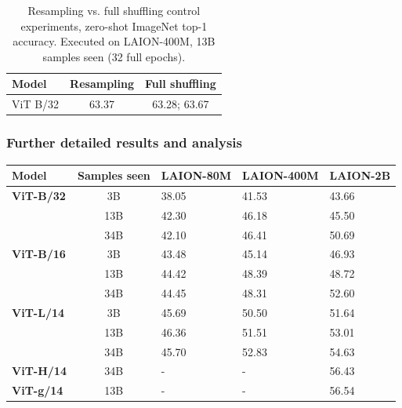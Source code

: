 \begin{appendix}
\begin{table}[!htb]
\setlength\tabcolsep{3.0pt}
    \centering
    \small
    \begin{tabular}{lcc}\toprule
    Model & Resampling &  Full shuffling \\ \midrule
    ViT B/32 & 63.37 & 63.28; 63.67 \\\bottomrule
    \end{tabular}
    \caption{
    Resampling vs. full shuffling control experiments, zero-shot ImageNet top-1 accuracy. Executed on LAION-400M, 13B samples seen (32 full epochs).
    \vspace{-1em}
    }
    \label{tab:resampling_shuffling}
\end{table}


\subsubsection{Further detailed results and analysis}
\label{sec:appendix:further_results}

\begin{table}[!tbh]
\centering
\small
{}
\begin{tabular}{@{}lclll@{}}
\toprule
\textbf{Model}                     & \textbf{Samples seen} & \textbf{LAION-80M} & \textbf{LAION-400M} & \textbf{LAION-2B} \\ \midrule
\textbf{ViT-B/32} & 3B           & 38.05     & 41.53      & 43.66       \\
                          & 13B          & 42.30     & 46.18       & 45.50       \\
                          & 34B          & 42.10         & 46.41      &50.69        \\ \midrule
\textbf{ViT-B/16} & 3B           & 43.48     & 45.14      & 46.93       \\
                          & 13B          & 44.42     & 48.39       & 48.72       \\
                          & 34B          & 44.45         & 48.31      & 52.60        \\ \midrule                          
\textbf{ViT-L/14} & 3B           & 45.69     & 50.50      & 51.64       \\         
& 13B          & 46.36         & 51.51      & 53.01           \\
                          & 34B          & 45.70         & 52.83       & 54.63       \\ \midrule 
\textbf{ViT-H/14} & 34B           & -     & -      & 56.43       \\         \midrule 
\textbf{ViT-g/14} & 13B           & -     & -      & 56.54       \\         \bottomrule 


\end{tabular}
\end{table}
\end{appendix}
